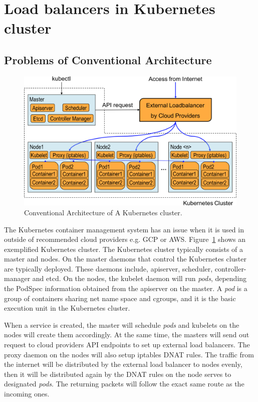 \section{Load balancers in Kubernetes cluster}\label{Load balancers in Kubernetes cluster}

\subsection{Problems of Conventional Architecture}

\begin{figure}
\includegraphics[width=\columnwidth]{Figs/K8sConventional}
\caption{Conventional Architecture of A Kubernetes cluster.}
\label{fig:K8sConventional}
\end{figure}

The Kubernetes container management system has an issue when it is used in outside of recommended cloud providers e.g. GCP or AWS.
Figure~\ref{fig:K8sConventional} shows an exemplified Kubernetes cluster.
The Kubernetes cluster typically consists of a master and nodes.
On the master daemons that control the Kubernetes cluster are typically deployed. 
These daemons include, apiserver, scheduler, controller-manager and etcd. 
On the nodes, the kubelet daemon will run {\it pods}, depending the PodSpec information obtained from the apiserver on the master.
A {\em pod} is a group of containers sharing net name space and cgroups, 
and it is the basic execution unit in the Kubernetes cluster.

When a service is created, the master will schedule {\em pods} and kubelets on the nodes will create them accordingly.
At the same time, the masters will send out request to cloud providers API endpoints to set up external load balancers.
The proxy daemon on the nodes will also setup iptables DNAT\cite{MartinA.Brown2017} rules. 
The traffic from the internet will be distributed by the external load balancer to nodes evenly, 
then it will be distributed again by the DNAT rules on the node serves to designated {\em pods}. 
The returning packets will follow the exact same route as the incoming ones.


